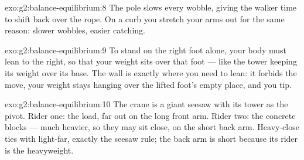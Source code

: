 \begin{solution}{exo:g2:balance-equilibrium:8}
The pole slows every wobble, giving the walker time to shift back
over the rope. On a curb you stretch your arms out for the same
reason: slower wobbles, easier catching.
\end{solution}

\begin{solution}{exo:g2:balance-equilibrium:9}
To stand on the right foot alone, your body must lean to the right,
so that your weight sits over that foot --- like the tower keeping
its weight over its base. The wall is exactly where you need to
lean: it forbids the move, your weight stays hanging over the lifted
foot's empty place, and you tip.
\end{solution}

\begin{solution}{exo:g2:balance-equilibrium:10}
The crane is a giant seesaw with its tower as the pivot. Rider one:
the load, far out on the long front arm. Rider two: the concrete
blocks --- much heavier, so they may sit close, on the short back
arm. Heavy-close ties with light-far, exactly the seesaw rule; the
back arm is short because its rider is the heavyweight.
\end{solution}
